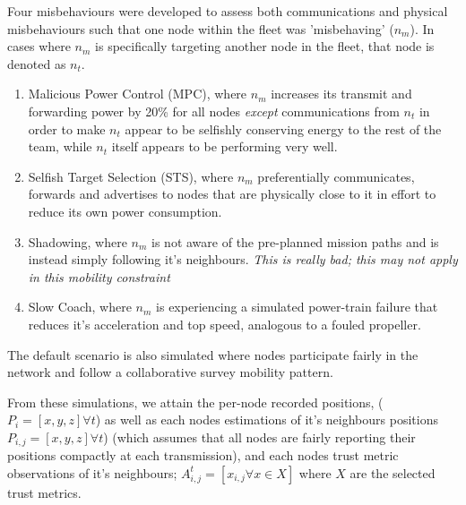 \documentclass{aamas2016}
\begin{document}
Four misbehaviours were developed to assess both communications and physical misbehaviours such that one node within the fleet was 'misbehaving' ($n_m$). In cases where $n_m$ is specifically targeting another node in the fleet, that node is denoted as $n_t$.

\begin{enumerate}
	\item Malicious Power Control (MPC), where $n_m$ increases its transmit and forwarding power by 20\% for all nodes \emph{except} communications from $n_t$ in order to make $n_t$ appear to be selfishly conserving energy to the rest of the team, while $n_t$ itself appears to be performing very well.
	\item Selfish Target Selection (STS), where $n_m$ preferentially communicates, forwards and advertises to nodes that are physically close to it in effort to reduce its own power consumption.
	\item Shadowing, where $n_m$ is not aware of the pre-planned mission paths and is instead simply following it's neighbours. \textit{This is really bad; this may not apply in this mobility constraint}
	\item Slow Coach, where $n_m$ is experiencing a simulated power-train failure that reduces it's acceleration and top speed, analogous to a fouled propeller. 
\end{enumerate}

The default scenario is also simulated where nodes participate fairly in the network and follow a collaborative survey mobility pattern.

From these simulations, we attain the per-node recorded positions, ($P_i = [x,y,z] \forall t$) as well as each nodes estimations of it's neighbours positions $P_{i,j} = [x,y,z] \forall t$) (which assumes that all nodes are fairly reporting their positions compactly at each transmission), and each nodes trust metric observations of it's neighbours; $A_{i,j}^t = [ x_{i,j} \forall x \in X ] $ where $X$ are the selected trust metrics.
\end{document}
